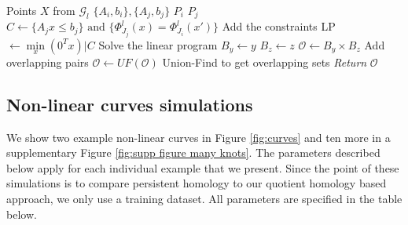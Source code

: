 \documentclass[10pt]{article} %
\theoremstyle{plain}
\theoremstyle{definition}
\theoremstyle{remark}
\begin{document}
\begin{algorithm}
    \caption{Linear programming for overlap detection}
    \label{alg:linprog}
\begin{algorithmic}
     Points $X$ from $\mathcal{G}_l$
            \STATE $\{A_i,b_i\},  \{A_j, b_j\}$  $P_i$  $P_j$
                \STATE $C \gets \{A_jx \leq b_j\} \text{ and } \{\Phi^l_{J_j}(x)= \Phi^l_{J_i}(x')\}$ Add the constraints
                \STATE LP $\gets \min\limits_{x}(0^Tx)|C$ Solve the linear program
                        \STATE $B_y \gets y$  $B_z \gets z$
                    \ENDIF
                \ENDFOR
            \STATE $\mathcal{O} \gets B_y\times B_z$ Add overlapping pairs
            \ENDFOR
        \STATE $\mathcal{O} \gets UF(\mathcal{O})$ Union-Find to get overlapping sets
    \STATE \textit{Return} $\mathcal{O}$
\end{algorithmic}
\end{algorithm}

\subsection{Non-linear curves simulations}
We show two example non-linear curves in Figure \ref{fig:curves} and ten more in a supplementary Figure \ref{fig:supp figure many knots}. The parameters described below apply for each individual example that we present. Since the point of these simulations is to compare persistent homology to our quotient homology based approach, we only use a training dataset. All parameters are specified in the table below.

\begin{table}[ht]
\caption{Parameters for non-linear curve simulations}
\label{curves params}
\vskip 0.15in
\begin{center}
\begin{small}
\begin{sc}
\end{sc}
\end{small}
\end{center}
\vskip -0.1in
\end{table}
\end{document}
